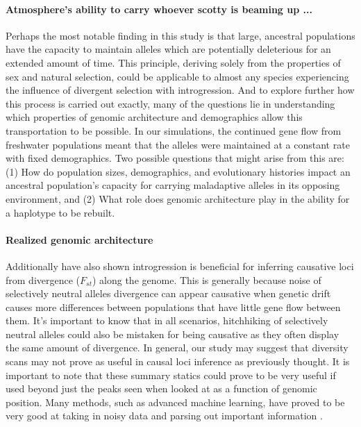 \documentclass{article}
\begin{document}
 \paragraph{Atmosphere's ability to carry whoever scotty is beaming up ... }
Perhaps the most notable finding in this study is that large, ancestral populations have the capacity to maintain alleles which are potentially deleterious for an extended amount of time.  
This principle, deriving solely from the properties of sex and natural selection, could be applicable to almost any species experiencing the influence of divergent selection with introgression.
And to explore further how this process is carried out exactly, many of the questions lie in understanding which properties of genomic architecture and demographics allow this transportation to be possible. 
In our simulations, the continued gene flow from freshwater populations meant that the alleles were maintained at a constant rate with fixed demographics. 
Two possible questions that might arise from this are:
(1) How do population sizes, demographics, and evolutionary histories impact an ancestral population's capacity for carrying maladaptive alleles in its opposing environment, and 
(2) What role does genomic architecture play in the ability for a haplotype to be rebuilt.

\paragraph{Realized genomic architecture}
Additionally have also shown introgression is beneficial for inferring causative loci from divergence ($F_{st}$) along the genome. 
This is generally because noise of selectively neutral alleles divergence can appear causative when genetic drift causes more 
differences between populations that have little gene flow between them.
It's important to know that in all scenarios, hitchhiking of selectively neutral alleles could also be 
mistaken for being causative as they often display the same amount of divergence.
In general, our study may suggest that diversity scans may not prove as useful in causal loci inference as previously thought.
It is important to note that these summary statics could prove to be very useful if used beyond just the peaks seen when looked at as a function of genomic position. 
Many methods, such as advanced machine learning, have proved to be very good at taking in noisy data and parsing out important information \citet{Schrider2018}.
\end{document}
